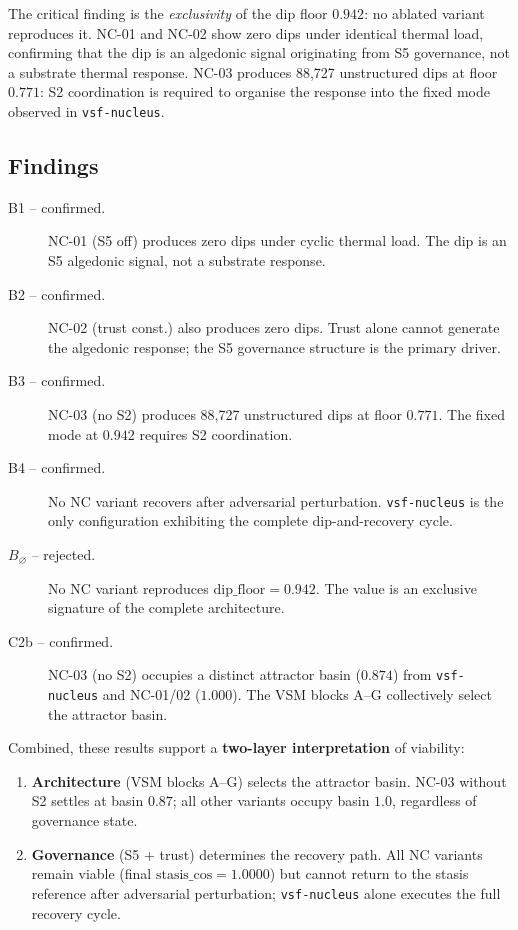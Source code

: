 \documentclass[11pt, a4paper]{article}
\newcommand{\nucleus}{\texttt{vsf-nucleus}}
\begin{document}
The critical finding is the \emph{exclusivity} of the dip floor $0.942$: no
ablated variant reproduces it.
NC-01 and NC-02 show zero dips under identical thermal load, confirming that the
dip is an algedonic signal originating from S5 governance, not a substrate
thermal response.
NC-03 produces 88,727 unstructured dips at floor $0.771$: S2 coordination is
required to organise the response into the fixed mode observed in \nucleus{}.

\subsection{Findings}
\label{sec:nc_findings}

\begin{description}
  \item[B1 -- confirmed.] NC-01 (S5 off) produces zero dips under cyclic thermal
    load. The dip is an S5 algedonic signal, not a substrate response.
  \item[B2 -- confirmed.] NC-02 (trust const.) also produces zero dips. Trust
    alone cannot generate the algedonic response; the S5 governance structure
    is the primary driver.
  \item[B3 -- confirmed.] NC-03 (no S2) produces 88,727 unstructured dips at
    floor $0.771$. The fixed mode at $0.942$ requires S2 coordination.
  \item[B4 -- confirmed.] No NC variant recovers after adversarial perturbation.
    \nucleus{} is the only configuration exhibiting the complete dip-and-recovery
    cycle.
  \item[$B_\varnothing$ -- rejected.] No NC variant reproduces
    $\text{dip\_floor} = 0.942$. The value is an exclusive signature of the
    complete architecture.
  \item[C2b -- confirmed.] NC-03 (no S2) occupies a distinct attractor
    basin ($0.874$) from \nucleus{} and NC-01/02 ($1.000$). The VSM
    blocks A--G collectively select the attractor basin.
\end{description}

Combined, these results support a \textbf{two-layer interpretation} of viability:
\begin{enumerate}
  \item \textbf{Architecture} (VSM blocks A--G) selects the attractor basin.
    NC-03 without S2 settles at basin $0.87$; all other variants occupy basin
    $1.0$, regardless of governance state.
  \item \textbf{Governance} (S5 + trust) determines the recovery path.
    All NC variants remain viable (final $\text{stasis\_cos} = 1.0000$) but
    cannot return to the stasis reference after adversarial perturbation;
    \nucleus{} alone executes the full recovery cycle.
\end{enumerate}
\end{document}
